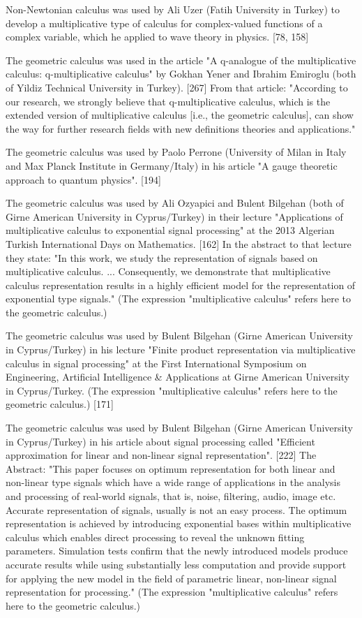 \documentclass[12pt]{article}
\begin{document}
Non-Newtonian calculus was used by Ali Uzer (Fatih University in Turkey) to develop a multiplicative type of calculus for complex-valued functions of a complex variable, which he applied to wave theory in physics. [78, 158]

The geometric calculus was used in the article "A q-analogue of the multiplicative calculus: q-multiplicative calculus" by Gokhan Yener and Ibrahim Emiroglu (both of Yildiz Technical University in Turkey). [267] From that article: "According to our research, we strongly believe that q-multiplicative calculus, which is the extended version of multiplicative calculus [i.e., the geometric calculus], can show the way for further research fields with new definitions theories and applications."

The geometric calculus was used by Paolo Perrone (University of Milan in Italy and Max Planck Institute in Germany/Italy) in his article "A gauge theoretic approach to quantum physics". [194]

The geometric calculus was used by Ali Ozyapici and Bulent Bilgehan (both of Girne American University in Cyprus/Turkey) in their lecture "Applications of multiplicative calculus to exponential signal processing" at the 2013 Algerian Turkish International Days on Mathematics. [162] In the abstract to that lecture they state: "In this work, we study the representation of signals based on multiplicative calculus. ... Consequently, we demonstrate that multiplicative calculus representation results in a highly efficient model for the representation of exponential type signals." (The expression "multiplicative calculus" refers here to the geometric calculus.)

The geometric calculus was used by Bulent Bilgehan (Girne American University in Cyprus/Turkey) in his lecture "Finite product representation via multiplicative calculus in signal processing" at the First International Symposium on Engineering, Artificial Intelligence & Applications at Girne American University in Cyprus/Turkey. (The expression "multiplicative calculus" refers here to the geometric calculus.) [171]

The geometric calculus was used by Bulent Bilgehan (Girne American University in Cyprus/Turkey) in his article about signal processing called "Efficient approximation for linear and non-linear signal representation". [222] The Abstract: "This paper focuses on optimum representation for both linear and non-linear type signals which have a wide range of applications in the analysis and processing of real-world signals, that is, noise, filtering, audio, image etc. Accurate representation of signals, usually is not an easy process. The optimum representation is achieved by introducing exponential bases within multiplicative calculus which enables direct processing to reveal the unknown fitting parameters. Simulation tests confirm that the newly introduced models produce accurate results while using substantially less computation and provide support for applying the new model in the field of parametric linear, non-linear signal representation for processing." (The expression "multiplicative calculus" refers here to the geometric calculus.)
\end{document}
